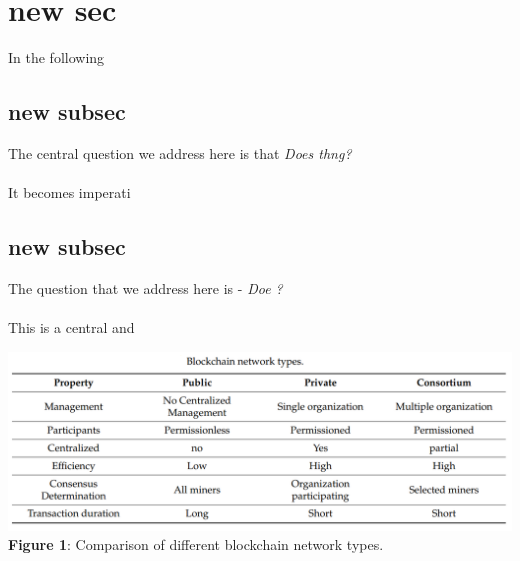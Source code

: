 \documentclass[12pt,a4paper]{article}%
\begin{document}
	\section{new sec}
	\begin{flushleft}
		\justify
		In the following
		\subsection{new subsec}
		\begin{flushleft}
			\justify
			The central question we address here is that \textit{Does thng?}\\\\
			It becomes imperati 
			
		\end{flushleft}
	
		\subsection{new subsec}
		\begin{flushleft}
			\justify
			The question that we address here is - \textit{Doe ?}\\\\
			This is a central and
			\begin{center}
			\includegraphics[width=0.90 \textwidth]{./blockchain_network_types.png}
			\\\textbf{Figure 1}: Comparison of different blockchain network types.
			\end{center}
		\end{flushleft}
	

\end{flushleft}
\end{document}
